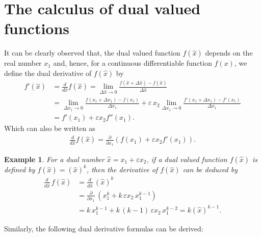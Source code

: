 \documentclass[11pt,a4paper,fleqn]{article}
\newtheorem{example}{Example}
\numberwithin{equation}{section}
\numberwithin{lemma}{section}
\numberwithin{theorem}{section}
\numberwithin{corollary}{section}
\begin{document}
\section{The calculus of dual valued functions}
It can be clearly observed that, the dual valued function $f(\widehat{x})$ depends on the real number $x_1$ and, hence, for a continuous differentiable function $f(x)$, we define the dual derivative of $f(\widehat{x})$  by
\begin{align}
	f'(\widehat{x}) & = \frac{d}{d \widehat{x}} f(\widehat{x})  = \lim_{\Delta \widehat{x} \to 0} \frac{f(\widehat{x} + \Delta \widehat{x}) - f(\widehat{x})}{\Delta \widehat{x}}\nonumber\\
	& = \lim_{\Delta {x_1} \to 0} \frac{f({x_1} + \Delta {x_1}) - f({x_1})}{\Delta {x_1}} + \varepsilon \, x_2 \lim_{\Delta {x_1} \to 0} \frac{f'({x_1} + \Delta {x_1}) - f'({x_1})}{\Delta {x_1}} \nonumber\\
	& = f'(x_1) + \varepsilon x_2 f''(x_1). 
\end{align} 
Which can also be written as
\begin{align}
\frac{d}{d \widehat{x}} f(\widehat{x}) = \frac{\partial}{\partial x_1} \left(f(x_1) + \varepsilon x_2 f'(x_1)\right).
\end{align}
\begin{example}
For a dual number $\widehat{x} = x_1 + \varepsilon x_2$, if a dual valued function $f(\widehat{x})$ is defined by $f(\widehat{x}) = (\widehat{x})^k$, then the derivative of $f(\widehat{x})$ can be deduced by
\begin{align*}
	\frac{d}{d \widehat{x}} \, f(\widehat{x}) & = \frac{d}{d \widehat{x}} \, (\widehat{x})^k\\
	& = \frac{\partial}{\partial x_1} \, (x_1^k + k \, \varepsilon x_2 \, x_1^{k - 1} )\\
	& = k \, x_1^{k - 1} + k \, (k - 1) \, \varepsilon x_2 \, x_1^{k - 2} = k (\widehat{x})^{k - 1}.
\end{align*}
\end{example}
Similarly, the following dual derivative formulas can be derived:
\end{document}
